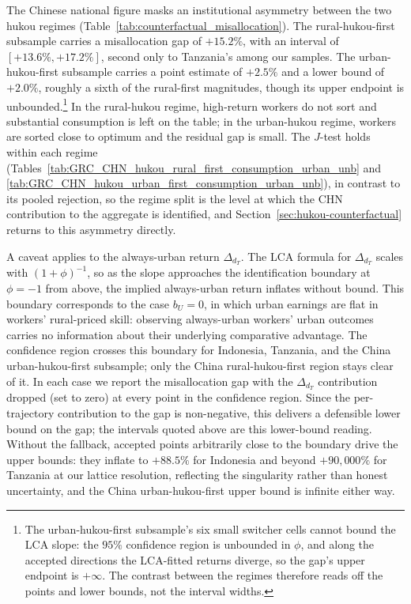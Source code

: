 The Chinese national figure masks an institutional asymmetry between the two hukou regimes (Table~\ref{tab:counterfactual_misallocation}).
The rural-hukou-first subsample carries a misallocation gap of $+15.2\%$, with an interval of $[+13.6\%, +17.2\%]$, second only to Tanzania's among our samples.
The urban-hukou-first subsample carries a point estimate of $+2.5\%$ and a lower bound of $+2.0\%$, roughly a sixth of the rural-first magnitudes, though its upper endpoint is unbounded.\footnote{The urban-hukou-first subsample's six small switcher cells cannot bound the LCA slope: the $95\%$ confidence region is unbounded in $\phi$, and along the accepted directions the LCA-fitted returns diverge, so the gap's upper endpoint is $+\infty$. The contrast between the regimes therefore reads off the points and lower bounds, not the interval widths.}
In the rural-hukou regime, high-return workers do not sort and substantial consumption is left on the table; in the urban-hukou regime, workers are sorted close to optimum and the residual gap is small.
The $J$-test holds within each regime (Tables~\ref{tab:GRC_CHN_hukou_rural_first_consumption_urban_unb} and \ref{tab:GRC_CHN_hukou_urban_first_consumption_urban_unb}), in contrast to its pooled rejection, so the regime split is the level at which the CHN contribution to the aggregate is identified, and Section~\ref{sec:hukou-counterfactual} returns to this asymmetry directly.



A caveat applies to the always-urban return $\Delta_{d_T}$.
The LCA formula for $\Delta_{d_T}$ scales with $(1+\phi)^{-1}$, so as the slope approaches the identification boundary at $\phi = -1$ from above, the implied always-urban return inflates without bound.
This boundary corresponds to the case $b_U = 0$, in which urban earnings are flat in workers' rural-priced skill: observing always-urban workers' urban outcomes carries no information about their underlying comparative advantage.
The confidence region crosses this boundary for Indonesia, Tanzania, and the China urban-hukou-first subsample; only the China rural-hukou-first region stays clear of it.
In each case we report the misallocation gap with the $\Delta_{d_T}$ contribution dropped (set to zero) at every point in the confidence region.
Since the per-trajectory contribution to the gap is non-negative, this delivers a defensible lower bound on the gap; the intervals quoted above are this lower-bound reading.
Without the fallback, accepted points arbitrarily close to the boundary drive the upper bounds: they inflate to $+88.5\%$ for Indonesia and beyond $+90{,}000\%$ for Tanzania at our lattice resolution, reflecting the singularity rather than honest uncertainty, and the China urban-hukou-first upper bound is infinite either way.

